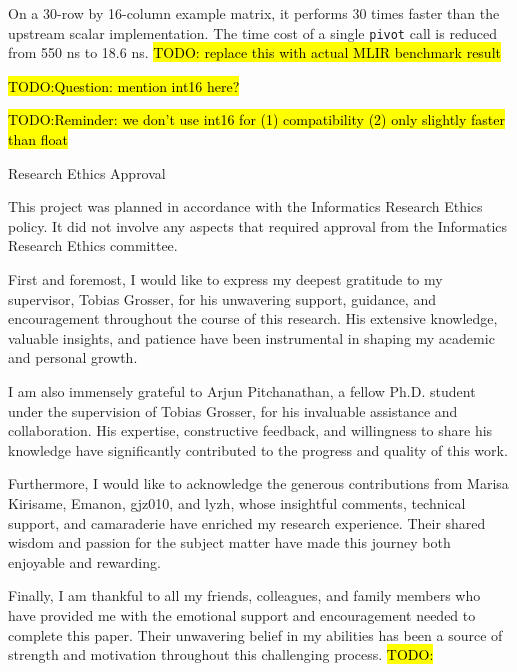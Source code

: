 \documentclass[logo,bsc,singlespacing,parskip]{infthesis}
\begin{document}
\begin{preliminary}
{On a 30-row by 16-column example matrix, it performs 30 times faster than the
upstream scalar implementation. The time cost of a single \texttt{pivot} call is
reduced from 550 ns to 18.6 ns. \hl{TODO: replace this with actual MLIR benchmark
result}

\hl{TODO:Question: mention int16 here?}

\hl{TODO:Reminder: we don't use int16 for (1) compatibility (2) only slightly faster than float}

}

\maketitle

\newenvironment{ethics}
   {\begin{frontenv}{Research Ethics Approval}{\LARGE}}
   {\end{frontenv}\newpage}

\begin{ethics}

This project was planned in accordance with the Informatics Research
Ethics policy. It did not involve any aspects that required approval
from the Informatics Research Ethics committee.

\standarddeclaration
\end{ethics}


\begin{acknowledgements}
    First and foremost, I would like to express my deepest gratitude to my
    supervisor, Tobias Grosser, for his unwavering support, guidance, and
    encouragement throughout the course of this research. His extensive
    knowledge, valuable insights, and patience have been instrumental in shaping
    my academic and personal growth.

    I am also immensely grateful to Arjun Pitchanathan, a fellow Ph.D. student
    under the supervision of Tobias Grosser, for his invaluable assistance and
    collaboration. His expertise, constructive feedback, and willingness to
    share his knowledge have significantly contributed to the progress and
    quality of this work.
    
    Furthermore, I would like to acknowledge the generous contributions from
    Marisa Kirisame, Emanon, gjz010, and lyzh, whose insightful comments,
    technical support, and camaraderie have enriched my research experience.
    Their shared wisdom and passion for the subject matter have made this
    journey both enjoyable and rewarding.
    
    Finally, I am thankful to all my friends, colleagues, and family members who
    have provided me with the emotional support and encouragement needed to
    complete this paper. Their unwavering belief in my abilities has been a
    source of strength and motivation throughout this challenging process.
\hl{TODO:}

\end{acknowledgements}


\tableofcontents
\end{preliminary}
\end{document}
